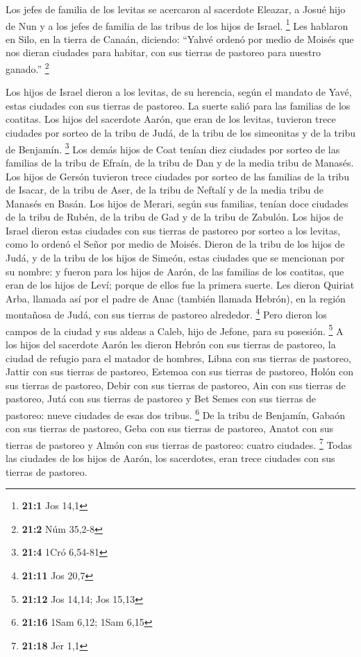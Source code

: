 \begin{paracol}{2}
 Los jefes de familia de los levitas se acercaron al
sacerdote Eleazar, a Josué hijo de Nun y a los jefes de familia de las
tribus de los hijos de Israel. \footnote{\textbf{21:1} Jos 14,1}
 Les hablaron en Silo, en la tierra de Canaán, diciendo:
``Yahvé ordenó por medio de Moisés que nos dieran ciudades para habitar,
con sus tierras de pastoreo para nuestro ganado.'' \footnote{\textbf{21:2}
  Núm 35,2-8}

 Los hijos de Israel dieron a los levitas, de su herencia,
según el mandato de Yavé, estas ciudades con sus tierras de pastoreo.
 La suerte salió para las familias de los coatitas. Los
hijos del sacerdote Aarón, que eran de los levitas, tuvieron trece
ciudades por sorteo de la tribu de Judá, de la tribu de los simeonitas y
de la tribu de Benjamín. \footnote{\textbf{21:4} 1Cró 6,54-81}
 Los demás hijos de Coat tenían diez ciudades por sorteo
de las familias de la tribu de Efraín, de la tribu de Dan y de la media
tribu de Manasés.  Los hijos de Gersón tuvieron trece
ciudades por sorteo de las familias de la tribu de Isacar, de la tribu
de Aser, de la tribu de Neftalí y de la media tribu de Manasés en Basán.
 Los hijos de Merari, según sus familias, tenían doce
ciudades de la tribu de Rubén, de la tribu de Gad y de la tribu de
Zabulón.  Los hijos de Israel dieron estas ciudades con
sus tierras de pastoreo por sorteo a los levitas, como lo ordenó el
Señor por medio de Moisés.  Dieron de la tribu de los
hijos de Judá, y de la tribu de los hijos de Simeón, estas ciudades que
se mencionan por su nombre:  y fueron para los hijos de
Aarón, de las familias de los coatitas, que eran de los hijos de Leví;
porque de ellos fue la primera suerte.  Les dieron
Quiriat Arba, llamada así por el padre de Anac (también llamada Hebrón),
en la región montañosa de Judá, con sus tierras de pastoreo alrededor.
\footnote{\textbf{21:11} Jos 20,7}  Pero dieron los
campos de la ciudad y sus aldeas a Caleb, hijo de Jefone, para su
posesión. \footnote{\textbf{21:12} Jos 14,14; Jos 15,13} 
A los hijos del sacerdote Aarón les dieron Hebrón con sus tierras de
pastoreo, la ciudad de refugio para el matador de hombres, Libna con sus
tierras de pastoreo,  Jattir con sus tierras de pastoreo,
Estemoa con sus tierras de pastoreo,  Holón con sus
tierras de pastoreo, Debir con sus tierras de pastoreo, 
Ain con sus tierras de pastoreo, Jutá con sus tierras de pastoreo y Bet
Semes con sus tierras de pastoreo: nueve ciudades de esas dos tribus.
\footnote{\textbf{21:16} 1Sam 6,12; 1Sam 6,15}  De la
tribu de Benjamín, Gabaón con sus tierras de pastoreo, Geba con sus
tierras de pastoreo,  Anatot con sus tierras de pastoreo
y Almón con sus tierras de pastoreo: cuatro ciudades. \footnote{\textbf{21:18}
  Jer 1,1}  Todas las ciudades de los hijos de Aarón, los
sacerdotes, eran trece ciudades con sus tierras de pastoreo.


\end{paracol}
